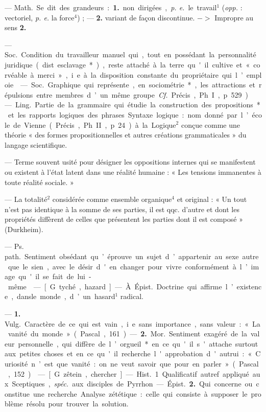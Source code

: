 \begin{itemize}[leftmargin=1cm, label=, itemsep=1pt]
 — \si{Math.} Se dit des grandeurs : {\bf 1.} non dirigées, {\it p. e.} le travail$^1$ ({\it opp.} : vectoriel, {\it p. e.} la force$^4$) ;
— {\bf 2.} variant de façon discontinue.
$->$ Impropre au sens {\bf 2.}

 — \si{Soc.} Condition du travailleur manuel qui, tout en possédant la personnalité juridique
(dist. esclavage*), reste attaché à
la terre qu'il cultive et « corvéable
à merci », i.e. à la disposition
constante du propriétaire qui l’emploie.

 — \si{Soc.} Graphique qui
représente, en sociométrie*, les
attractions et répulsions entre
membres d’un même groupe. {\it Cf.}
Précis, Ph. I, p. 529).

 — \si{Ling.} Partie de la grammaire qui étudie la construction
des propositions* et les rapports
logiques des phrases. Syntaxe logique : nom donné par l’école de
Vienne (Précis, Ph. II, p. 24) à la
Logique$^2$ conçue comme une théorie « des formes propositionnelles
et autres créations grammaticales »
du langage scientifique.

 — Terme souvent usité
pour désigner les oppositions internes qui se manifestent ou existent à l’état latent dans une réalité
humaine : « Les tensions immanentes à toute réalité sociale. »

 — La totalité$^2$ considérée
comme ensemble organique$^4$ et
original : « Un tout n’est pas identique à la somme de ses parties,
il est qqc. d’autre et dont les propriétés diffèrent de celles que présentent les parties dont il est composé » (Durkheim).

 — \si{Ps. path.} Sentiment obsédant qu’éprouve un sujet
d’appartenir au sexe autre que le
sien, avec le désir d'en changer
pour vivre conformément à l’image
qu'il se fait de lui-même.

 — [G. tyché, hazard] —
À \si{Épist.} Doctrine qui affirme l’existence, dansle monde, d’un hasard$^1$
radical.

 — {\bf 1.} \si{Vulg.} Caractère de ce
qui est vain, i.e. sans importance,
sans valeur : « La vanité du
monde » (Pascal, 161). — {\bf 2.} \si{Mor.}
Sentiment exagéré de la valeur
personnelle, qui diffère de l’orgueil*
en ce qu'il s'attache surtout aux
petites choses et en ce qu'il recherche l'approbation d'autrui : « Curiosité n’est que vanité : on ne veut
savoir que pour en parler » (Pascal,
152).

 — [G. zêtein, chercher] — \si{Hist.}
1. Qualificatif autref. appliqué aux
Sceptiques, {\it spéc.} aux disciples de
Pyrrhon. — \si{Épist.} {\bf 2.} Qui concerne
ou constitue une recherche. Analyse zététique : celle qui consiste à
supposer le problème résolu pour
trouver la solution.

	\end{itemize}
